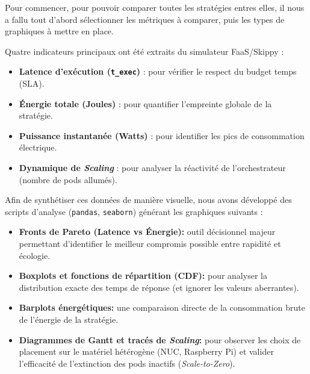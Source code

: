 Pour commencer, pour pouvoir comparer toutes les stratégies entres elles, il nous a fallu tout d'abord sélectionner les métriques à comparer, puis les types de graphiques à mettre en place.

Quatre indicateurs principaux ont été extraits du simulateur FaaS/Skippy :
\begin{itemize}
    \item \textbf{Latence d'exécution (\texttt{t\_exec})} : pour vérifier le respect du budget temps (SLA).
    \item \textbf{Énergie totale (Joules)} : pour quantifier l'empreinte globale de la stratégie.
    \item \textbf{Puissance instantanée (Watts)} : pour identifier les pics de consommation électrique.
    \item \textbf{Dynamique de \textit{Scaling}} : pour analyser la réactivité de l'orchestrateur (nombre de pods allumés).
\end{itemize}

Afin de synthétiser ces données de manière visuelle, nous avons développé des scripts d'analyse (\texttt{pandas}, \texttt{seaborn}) générant les graphiques suivants :
\begin{itemize}
    \item \textbf{Fronts de Pareto (Latence vs Énergie):} outil décisionnel majeur permettant d'identifier le meilleur compromis possible entre rapidité et écologie.
    \item \textbf{Boxplots et fonctions de répartition (CDF):} pour analyser la distribution exacte des temps de réponse (et ignorer les valeurs aberrantes).
    \item \textbf{Barplots énergétiques:} une comparaison directe de la consommation brute de l'énergie de la stratégie.
    \item \textbf{Diagrammes de Gantt et tracés de \textit{Scaling}:} pour observer les choix de placement sur le matériel hétérogène (NUC, Raspberry Pi) et valider l'efficacité de l'extinction des pods inactifs (\textit{Scale-to-Zero}).
\end{itemize}